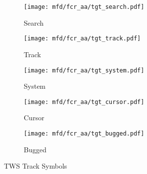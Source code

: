 \begin{figure}[htbp]
    \centering
    \begin{subfigure}[b]{0.15\linewidth}
        \centering
        \texttt{[image: mfd/fcr\_aa/tgt\_search.pdf]}
        \caption{Search}
        \label{fig:sensorsaa:apg68:tws:trackfile:search}
    \end{subfigure}
    \begin{subfigure}[b]{0.15\linewidth}
        \centering
        \texttt{[image: mfd/fcr\_aa/tgt\_track.pdf]}
        \caption{Track}
        \label{fig:sensorsaa:apg68:tws:trackfile:track}
    \end{subfigure}
    \begin{subfigure}[b]{0.15\linewidth}
        \centering
        \texttt{[image: mfd/fcr\_aa/tgt\_system.pdf]}
        \caption{System}
        \label{fig:sensorsaa:apg68:tws:trackfile:system}
    \end{subfigure}
    \begin{subfigure}[b]{0.15\linewidth}
        \centering
        \texttt{[image: mfd/fcr\_aa/tgt\_cursor.pdf]}
        \caption{Cursor}
        \label{fig:sensorsaa:apg68:tws:trackfile:cursor}
    \end{subfigure}
    \begin{subfigure}[b]{0.15\linewidth}
        \centering
        \texttt{[image: mfd/fcr\_aa/tgt\_bugged.pdf]}
        \caption{Bugged}
        \label{fig:sensorsaa:apg68:tws:trackfile:bugged}
    \end{subfigure}
    \caption{TWS Track Symbols}
    \label{fig:sensorsaa:apg68:tws:trackfile}
\end{figure}

